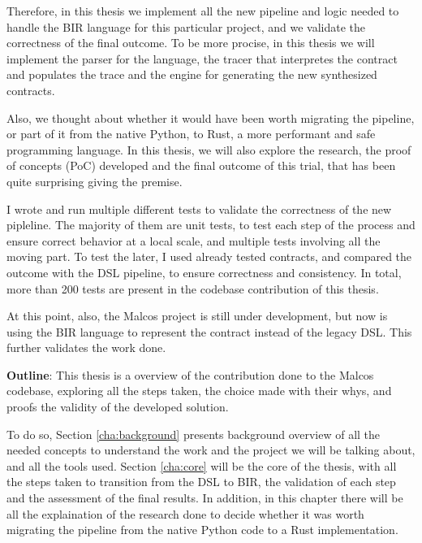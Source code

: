 Therefore, in this thesis we implement all the new pipeline and logic needed to
handle the BIR language for this particular project, and we validate the correctness
of the final outcome. To be more procise, in this thesis we will implement the parser
for the language, the tracer that interpretes the contract and populates the
trace and the engine for generating the new synthesized contracts.

Also, we thought about whether it would have been worth migrating the pipeline,
or part of it from the native Python, to Rust, a more performant and safe
programming language. In this thesis, we will also explore the research, the proof
of concepts (PoC) developed and the final outcome of this trial, that has been
quite surprising giving the premise.

I wrote and run multiple different tests to validate the correctness of the new
pipleline. The majority of them are unit tests, to test each step of the process
and ensure correct behavior at a local scale, and multiple tests involving all the
moving part. To test the later, I used already tested contracts, and compared
the outcome with the DSL pipeline, to ensure correctness and consistency. In
total, more than 200 tests are present in the codebase contribution of this thesis.

At this point, also, the Malcos project is still under development, but now is
using the BIR language to represent the contract instead of the legacy DSL. This
further validates the work done.

\textbf{Outline}: This thesis is a overview of the contribution done to the Malcos
codebase, exploring all the steps taken, the choice made with their whys, and
proofs the validity of the developed solution.

To do so, Section \ref{cha:background} presents background overview of all the needed
concepts to understand the work and the project we will be talking about, and
all the tools used. Section \ref{cha:core} will be the core of the thesis, with
all the steps taken to transition from the DSL to BIR, the validation of each step
and the assessment of the final results. In addition, in this chapter there will
be all the explaination of the research done to decide whether it was worth migrating
the pipeline from the native Python code to a Rust implementation.